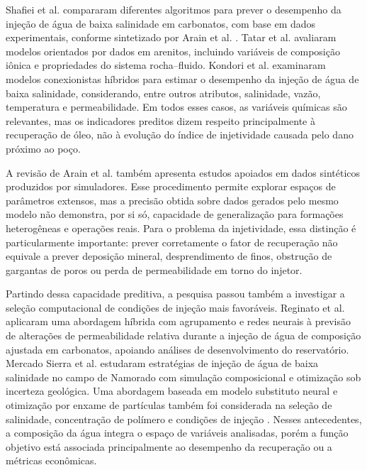 \documentclass[10pt,a4paper]{article}
\begin{document}
Shafiei et al. \cite{shafiei2022} compararam diferentes algoritmos para prever o desempenho da injeção de água de baixa salinidade em carbonatos, com base em dados experimentais, conforme sintetizado por Arain et al. \cite{arain2026review}. Tatar et al. \cite{tatar2021lswf} avaliaram modelos orientados por dados em arenitos, incluindo variáveis de composição iônica e propriedades do sistema rocha--fluido. Kondori et al. \cite{kondori2021lswf} examinaram modelos conexionistas híbridos para estimar o desempenho da injeção de água de baixa salinidade, considerando, entre outros atributos, salinidade, vazão, temperatura e permeabilidade. Em todos esses casos, as variáveis químicas são relevantes, mas os indicadores preditos dizem respeito principalmente à recuperação de óleo, não à evolução do índice de injetividade causada pelo dano próximo ao poço.

A revisão de Arain et al. \cite{arain2026review} também apresenta estudos apoiados em dados sintéticos produzidos por simuladores. Esse procedimento permite explorar espaços de parâmetros extensos, mas a precisão obtida sobre dados gerados pelo mesmo modelo não demonstra, por si só, capacidade de generalização para formações heterogêneas e operações reais. Para o problema da injetividade, essa distinção é particularmente importante: prever corretamente o fator de recuperação não equivale a prever deposição mineral, desprendimento de finos, obstrução de gargantas de poros ou perda de permeabilidade em torno do injetor.

Partindo dessa capacidade preditiva, a pesquisa passou também a investigar a seleção computacional de condições de injeção mais favoráveis. Reginato et al. \cite{hybrid2023} aplicaram uma abordagem híbrida com agrupamento e redes neurais à previsão de alterações de permeabilidade relativa durante a injeção de água de composição ajustada em carbonatos, apoiando análises de desenvolvimento do reservatório. Mercado Sierra et al. \cite{mercado2020} estudaram estratégias de injeção de água de baixa salinidade no campo de Namorado com simulação composicional e otimização sob incerteza geológica. Uma abordagem baseada em modelo substituto neural e otimização por enxame de partículas também foi considerada na seleção de salinidade, concentração de polímero e condições de injeção \cite{lowpolymer2024}. Nesses antecedentes, a composição da água integra o espaço de variáveis analisadas, porém a função objetivo está associada principalmente ao desempenho da recuperação ou a métricas econômicas.
\end{document}
